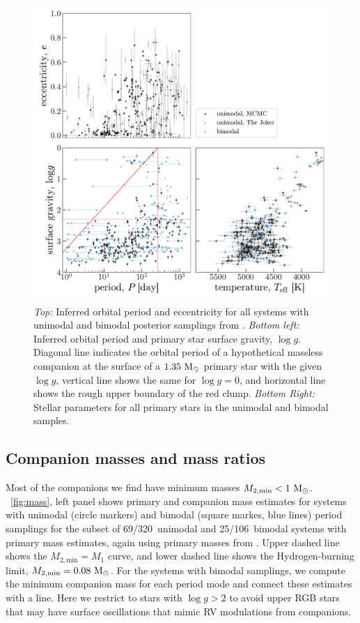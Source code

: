 \documentclass[modern, letterpaper]{aastex62}
\newcommand{\thejoker}{\project{The~Joker}}
\newcommand{\logg}{\ensuremath{\log g}}
\newcommand{\nbimodal}{106}
\newcommand{\nunimodal}{320}
\begin{document}
\begin{figure}[h]
\begin{center}
\includegraphics[width=\textwidth]{P-Teff-logg-e}
\end{center}
\caption{%
\textit{Top:} Inferred orbital period and eccentricity for all systems with
unimodal and bimodal posterior samplings from \thejoker.
\textit{Bottom left:} Inferred orbital period and primary star surface gravity,
\logg.
Diagonal line indicates the orbital period of a hypothetical massless companion
at the surface of a $1.35~\mathrm{M}_\odot$ primary star with the given \logg, vertical
line shows the same for $\logg = 0$, and horizontal line shows the rough upper
boundary of the red clump.
\textit{Bottom Right:} Stellar parameters for all primary stars in the unimodal
and bimodal samples.
\label{fig:logg-teff-p-e}
}
\end{figure}

\subsection{Companion masses and mass ratios}

Most of the companions we find have minimum masses $M_{2, \textrm{min}} <
1~\mathrm{M}_\odot$.
\figurename~\ref{fig:mass}, left panel shows primary and companion mass
estimates for systems with unimodal (circle markers) and bimodal (square markes,
blue lines) period samplings for the subset of 69/\nunimodal\ unimodal and
25/\nbimodal\ bimodal systems with primary mass estimates, again using primary
masses from \citet{Ness:2015}.
Upper dashed line shows the $M_{2, \textrm{min}} = M_1$ curve, and lower dashed
line shows the Hydrogen-burning limit, $M_{2, \textrm{min}} = 0.08~\mathrm{M}_\odot$.
For the systems with bimodal samplings, we compute the minimum companion mass
for each period mode and connect these estimates with a line.
Here we restrict to stars with $\logg > 2$ to avoid upper RGB stars that may
have surface oscillations that mimic RV modulations from companions.
\end{document}
